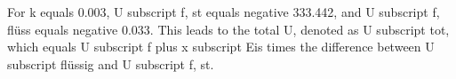 For k equals 0.003, U subscript f, st equals negative 333.442, and U subscript f, flüss equals negative 0.033. This leads to the total U, denoted as U subscript tot, which equals U subscript f plus x subscript Eis times the difference between U subscript flüssig and U subscript f, st.